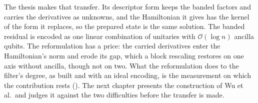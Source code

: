 The thesis makes that transfer. Its descriptor form keeps the banded factors and carries the derivatives as unknowns, and the Hamiltonian it gives has the kernel of the form it replaces, so the prepared state is the same solution. The banded residual is encoded as one linear combination of unitaries with $\mathcal O(\log n)$ ancilla qubits. The reformulation has a price: the carried derivatives enter the Hamiltonian's norm and erode its gap, which a block rescaling restores on one axis without ancilla, though not on two. What the reformulation does to the filter's degree, as built and with an ideal encoding, is the measurement on which the contribution rests (). The next chapter presents the construction of Wu et al.\ and judges it against the two difficulties before the transfer is made.

